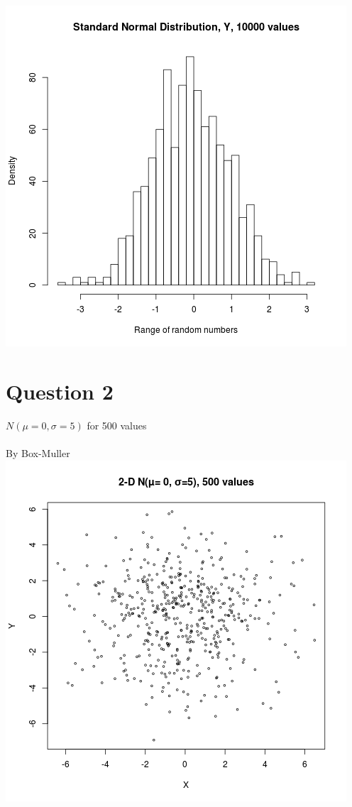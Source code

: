 \documentclass{article}
\begin{document}
\includegraphics{"plot2_3_Y"}

\pagebreak


\section{Question 2}
$N(\mu= 0, \sigma=5)$ for 500 values\\\\
By Box-Muller\\

\includegraphics{"plot3_1"}
\pagebreak
\end{document}
